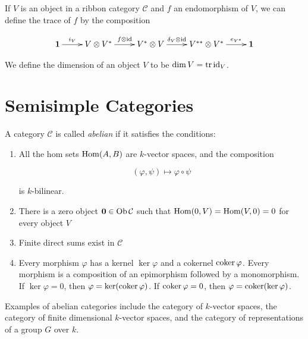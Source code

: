 If $V$ is an object in a ribbon category $\mathcal{C}$ and $f$ an endomorphism
of $V$, we can define the trace of $f$ by the composition

\begin{equation}
    \xymatrix{
    \mathbf{1} \ar[r]^-{i_V} & V \otimes V^* \ar[r]^-{f \otimes \id} & V^* \otimes V \ar[r]^-{\delta_V \otimes \id} & V^{**} \otimes V^* \ar[r]^-{e_{V^*}} & 
    \mathbf{1}
    }
\end{equation}

We define the dimension of an object $V$ to be $\dim V = \operatorname{tr} \operatorname{id}_V$.

\section{Semisimple Categories}
\begin{defn}
    A category $\mathcal{C}$ is called \emph{abelian} if it satisfies the conditions:

    \begin{enumerate}
    \renewcommand{\labelenumi}{\roman{enumi})}
        \item All the hom sets $\operatorname{Hom}(A,B)$ are $k$-vector spaces, and the composition
            
            \begin{equation}
                (\varphi, \psi) \mapsto \varphi \circ \psi
            \end{equation}

            is $k$-bilinear.
        \item There is a zero object $\mathbf{0} \in \operatorname{Ob} \mathcal{C}$ such that
            $\operatorname{Hom}(0,V) = \operatorname{Hom}(V,0) = 0$ for every object $V$
        \item Finite direct sums exist in $\mathcal{C}$
        \item Every morphism $\varphi$ has a kernel $\ker \varphi$ and a
            cokernel $\operatorname{coker} \varphi$. Every morphism is a composition of an
            epimorphism followed by a monomorphism. If $\ker \varphi = 0$, then
            $\varphi = \ker(\operatorname{coker} \varphi)$. If $\operatorname{coker} \varphi = 0$, then
            $\varphi = \operatorname{coker}(\ker \varphi)$.
    \end{enumerate}

    Examples of abelian categories include the category of $k$-vector spaces,
    the category of finite dimensional $k$-vector spaces, and the category of
    representations of a group $G$ over $k$.

\end{defn}

